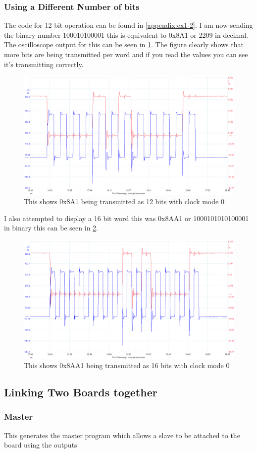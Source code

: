 \documentclass[a4paper,12pt]{scrartcl}
\begin{document}
{{			\subsubsection{Using a Different Number of bits}
			{
				The code for 12 bit operation can be found in \cref{appendix:ex1-2}. I am now sending the binary number 100010100001 this is equivalent to 0x8A1 or 2209 in decimal. The oscilloscope output for this can be seen in \cref{img:12bit0x8a1}. The figure clearly shows that more bits are being transmitted per word and if you read the values you can see it's transmitting correctly.
				\begin{figure}[h]
					\centering
					\includegraphics[width=\textwidth]{Ex1/12bit0x8a1}
					\caption{This shows 0x8A1 being transmitted as 12 bits with clock mode 0}
					\label{img:12bit0x8a1}
				\end{figure}
				I also attempted to display a 16 bit word this was 0x8AA1 or 1000101010100001 in binary this can be seen in \cref{img:16bit0x8aa1}.
				\begin{figure}[h]
					\centering
					\includegraphics[width=\textwidth]{Ex1/16bit0x8aa1}
					\caption{This shows 0x8AA1 being transmitted as 16 bits with clock mode 0}
					\label{img:16bit0x8aa1}
				\end{figure}
			}
		}
		\subsection{Linking Two Boards together}
		{
			\subsubsection{Master}
			{
				This generates the master program which allows a slave to be attached to the board using the outputs
			}
		}
	}
\end{document}
